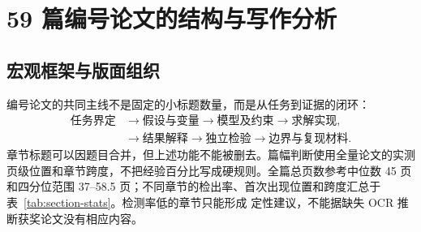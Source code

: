 \documentclass[UTF8,a4paper,12pt]{ctexart}
\begin{document}
\section{59 篇编号论文的结构与写作分析}

\subsection{宏观框架与版面组织}

编号论文的共同主线不是固定的小标题数量，而是从任务到证据的闭环：
\[
\begin{aligned}
\text{任务界定}&\longrightarrow\text{假设与变量}
\longrightarrow\text{模型及约束}\longrightarrow\text{求解实现},\\
&\longrightarrow\text{结果解释}
\longrightarrow\text{独立检验}\longrightarrow\text{边界与复现材料}.
\end{aligned}
\]
章节标题可以因题目合并，但上述功能不能被删去。篇幅判断使用全量论文的实测
页级位置和章节跨度，不把经验百分比写成硬规则。全篇总页数参考中位数
45 页和四分位范围 37--58.5 页；不同章节的检出率、首次出现位置和跨度汇总于
表~\ref{tab:section-stats}。检测率低的章节只能形成
定性建议，不能据缺失 OCR 推断获奖论文没有相应内容。
\end{document}
